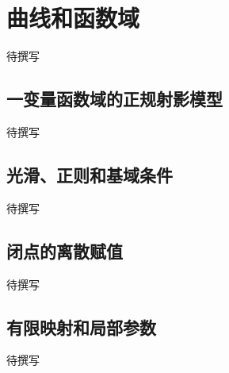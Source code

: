 
% 
% 

\section{曲线和函数域}
\label{g5:sec:2301}

待撰写

\subsection{一变量函数域的正规射影模型}
\label{g5:subsec:2301:01}
待撰写

\subsection{光滑、正则和基域条件}
\label{g5:subsec:2301:02}
待撰写

\subsection{闭点的离散赋值}
\label{g5:subsec:2301:03}
待撰写

\subsection{有限映射和局部参数}
\label{g5:subsec:2301:04}
待撰写
